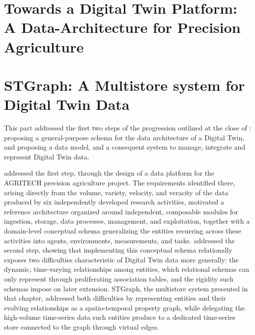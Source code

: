 \chapter{Towards a Digital Twin Platform: A Data-Architecture for Precision Agriculture}
\label{chap:dataplat}



\chapter{STGraph: A Multistore system for Digital Twin Data}
\label{chap:stgraph}


\begin{partsummary}

This part addressed the first two steps of the progression outlined at the close of : proposing a general-purpose schema for the data architecture of a Digital Twin, and proposing a data model, and a consequent system to manage, integrate and represent Digital Twin data.

 addressed the first step, through the design of a data platform for the AGRITECH precision agriculture project. The requirements identified there, arising directly from the volume, variety, velocity, and veracity of the data produced by six independently developed research activities, motivated a reference architecture organized around independent, composable modules for ingestion, storage, data processes, management, and exploitation, together with a domain-level conceptual schema generalizing the entities recurring across these activities into agents, environments, measurements, and tasks.  addressed the second step, showing that implementing this conceptual schema relationally exposes two difficulties characteristic of Digital Twin data more generally: the dynamic, time-varying relationships among entities, which relational schemas can only represent through proliferating association tables, and the rigidity such schemas impose on later extension. STGraph, the multistore system presented in that chapter, addressed both difficulties by representing entities and their evolving relationships as a spatio-temporal property graph, while delegating the high-volume time-series data such entities produce to a dedicated time-series store connected to the graph through virtual edges.


\end{partsummary}
